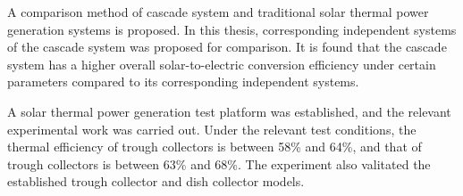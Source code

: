 {A comparison method of cascade system and traditional solar thermal power generation systems is proposed. In this thesis, corresponding independent systems of the cascade system was proposed for comparison. It is found that the cascade system has a higher overall solar-to-electric conversion efficiency under certain parameters compared to its corresponding independent systems.

A solar thermal power generation test platform was established, and the relevant experimental work was carried out. Under the relevant test conditions, the thermal efficiency of trough collectors is between 58\% and 64\%, and that of trough collectors is between 63\% and 68\%. The experiment also valitated the established trough collector and dish collector models.

%


}
